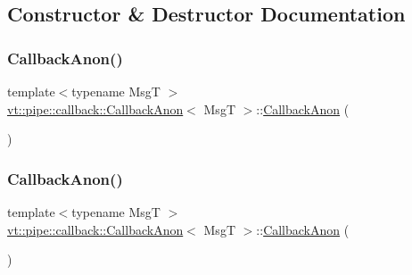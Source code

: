 \subsection{Constructor \& Destructor Documentation}
\mbox{\label{structvt_1_1pipe_1_1callback_1_1_callback_anon_aaca363b861f00c073c7b73dbef6e01fd}} 
\subsubsection{\texorpdfstring{Callback\+Anon()}{CallbackAnon()}\hspace{0.1cm}{\footnotesize\ttfamily [1/3]}}
{\footnotesize\ttfamily template$<$typename MsgT $>$ \\
\hyperlink{structvt_1_1pipe_1_1callback_1_1_callback_anon}{vt\+::pipe\+::callback\+::\+Callback\+Anon}$<$ MsgT $>$\+::\hyperlink{structvt_1_1pipe_1_1callback_1_1_callback_anon}{Callback\+Anon} (\begin{DoxyParamCaption}{ }\end{DoxyParamCaption})\hspace{0.3cm}{\ttfamily [default]}}

\mbox{\label{structvt_1_1pipe_1_1callback_1_1_callback_anon_a1979ced8fbd839d64f67eafb8fccdcff}} 
\subsubsection{\texorpdfstring{Callback\+Anon()}{CallbackAnon()}\hspace{0.1cm}{\footnotesize\ttfamily [2/3]}}
{\footnotesize\ttfamily template$<$typename MsgT $>$ \\
\hyperlink{structvt_1_1pipe_1_1callback_1_1_callback_anon}{vt\+::pipe\+::callback\+::\+Callback\+Anon}$<$ MsgT $>$\+::\hyperlink{structvt_1_1pipe_1_1callback_1_1_callback_anon}{Callback\+Anon} (\begin{DoxyParamCaption}\item[{\hyperlink{structvt_1_1pipe_1_1callback_1_1_callback_anon}{Callback\+Anon}$<$ MsgT $>$ const \&}]{ }\end{DoxyParamCaption})\hspace{0.3cm}{\ttfamily [default]}}

